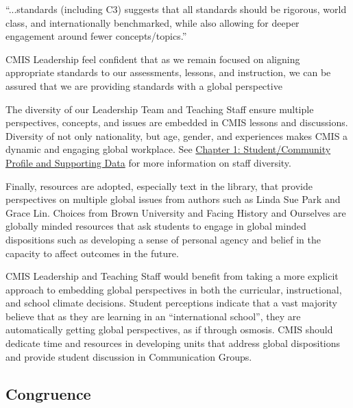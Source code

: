 \begin{findings}
“...standards (including C3) suggests that all standards should be rigorous, world class, and internationally benchmarked, while also allowing for deeper engagement around fewer concepts/topics.” 

CMIS Leadership feel confident that as we remain focused on aligning appropriate standards to our assessments, lessons, and instruction, we can be assured that we are providing standards with a global perspective 


The diversity of our Leadership Team and Teaching Staff ensure multiple perspectives, concepts, and issues are embedded in CMIS lessons and discussions. Diversity of not only nationality, but age, gender, and experiences makes CMIS a dynamic and engaging global workplace. See \href{https://docs.google.com/a/cmis.ac.th/document/d/1xv5c4vDAjs6UksU69e5l8UEZu0kYYJblDoKUj-29iXE/edit?usp=sharing}{Chapter 1: Student/Community Profile and Supporting Data} for more information on staff diversity. 


Finally, resources are adopted, especially text in the library, that provide perspectives on multiple global issues from authors such as Linda Sue Park and Grace Lin. Choices from Brown University and Facing History and Ourselves are globally minded resources that ask students to engage in global minded dispositions such as developing a sense of personal agency and belief in the capacity to affect outcomes in the future. 


CMIS Leadership and Teaching Staff would benefit from taking a more explicit approach to embedding global perspectives in both the curricular,  instructional, and school climate decisions. Student perceptions indicate that a vast majority believe that as they are learning in an “international school”, they are automatically getting global perspectives, as if through osmosis.  CMIS should dedicate time and resources in developing units that address global dispositions and provide student discussion in Communication Groups. 
\end{findings}

\subsection{Congruence}


